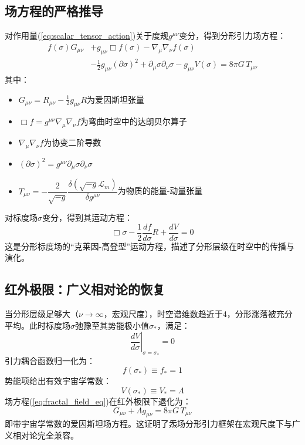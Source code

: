 \documentclass[12pt,a4paper,twocolumn]{article}
\begin{document}
\subsection{场方程的严格推导}
对作用量(\ref{eq:scalar_tensor_action})关于度规$g^{\mu\nu}$变分，得到分形引力场方程：
\[
\boxed{
\begin{aligned}
f(\sigma) G_{\mu\nu} &+ g_{\mu\nu} \Box f(\sigma) - \nabla_\mu \nabla_\nu f(\sigma) \\
&- \frac{1}{2} g_{\mu\nu} (\partial\sigma)^2 + \partial_\mu\sigma \partial_\nu\sigma - g_{\mu\nu} V(\sigma) = 8\pi G \, T_{\mu\nu}
\end{aligned}
}
\label{eq:fractal_field_eq}
\]
其中：
\begin{itemize}
\item $G_{\mu\nu} = R_{\mu\nu} - \frac{1}{2}g_{\mu\nu}R$为爱因斯坦张量
\item $\Box f = g^{\mu\nu}\nabla_\mu\nabla_\nu f$为弯曲时空中的达朗贝尔算子
\item $\nabla_\mu \nabla_\nu f$为协变二阶导数
\item $(\partial\sigma)^2 = g^{\mu\nu}\partial_\mu\sigma \partial_\nu\sigma$
\item $T_{\mu\nu} = -\dfrac{2}{\sqrt{-g}}\dfrac{\delta(\sqrt{-g}\mathcal{L}_m)}{\delta g^{\mu\nu}}$为物质的能量-动量张量
\end{itemize}

对标度场$\sigma$变分，得到其运动方程：
\[
\boxed{
\Box \sigma - \frac{1}{2}\frac{df}{d\sigma} R + \frac{dV}{d\sigma} = 0
}
\label{eq:sigma_eq}
\]
这是分形标度场的``克莱因-高登型''运动方程，描述了分形层级在时空中的传播与演化。

\subsection{红外极限：广义相对论的恢复}
当分形层级足够大（$\nu \to \infty$，宏观尺度），时空谱维数趋近于4，分形涨落被充分平均。此时标度场$\sigma$弛豫至其势能极小值$\sigma_*$，满足：
\begin{equation}
\left.\frac{dV}{d\sigma}\right|_{\sigma=\sigma_*} = 0
\end{equation}
引力耦合函数归一化为：
\begin{equation}
f(\sigma_*) \equiv f_* = 1
\end{equation}
势能项给出有效宇宙学常数：
\begin{equation}
V(\sigma_*) \equiv V_* = \Lambda
\end{equation}
场方程(\ref{eq:fractal_field_eq})在红外极限下退化为：
\[
\boxed{
G_{\mu\nu} + \Lambda g_{\mu\nu} = 8\pi G \, T_{\mu\nu}
}
\label{eq:GR_limit}
\]
即带宇宙学常数的爱因斯坦场方程。这证明了炁场分形引力框架在宏观尺度下与广义相对论完全兼容。
\end{document}
